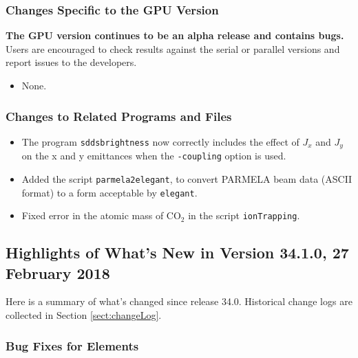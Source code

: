 \documentclass[11pt]{article}
\begin{document}
\subsubsection{Changes Specific to the GPU Version}

{\bf The GPU version continues to be an alpha release and contains bugs.}
Users are encouraged to check results against the serial or parallel versions and report issues to the developers.

\begin{itemize}
\item None.
\end{itemize}

\subsubsection{Changes to Related Programs and Files}

\begin{itemize}
\item The program \verb|sddsbrightness| now correctly includes the effect of $J_x$ and $J_y$ on the x and y emittances
  when the \verb|-coupling| option is used.
\item Added the script \verb|parmela2elegant|, to convert PARMELA beam data (ASCII format) to a form
  acceptable by \verb|elegant|.
\item Fixed error in the atomic mass of CO$_2$ in the script \verb|ionTrapping|.
\end{itemize}


\subsection{Highlights of What's New in Version 34.1.0, 27 February 2018}

Here is a summary of what's changed since release 34.0.
Historical change logs are collected in Section \ref{sect:changeLog}.

\subsubsection{Bug Fixes for Elements}
\end{document}
